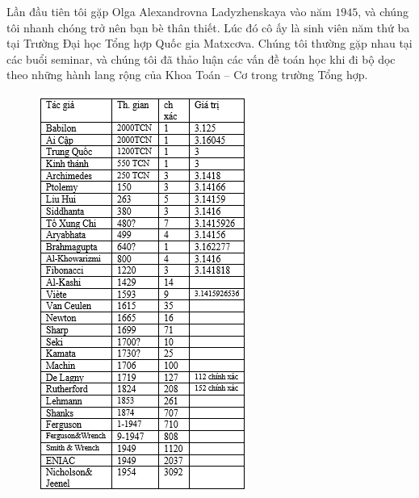 \begin{multicols}{2}
	Lần đầu tiên tôi gặp Olga Alexandrovna Ladyzhenskaya vào năm $1945$, và chúng tôi nhanh chóng trở nên bạn bè thân thiết. Lúc đó cô ấy là sinh viên năm thứ ba tại Trường Đại học Tổng hợp Quốc gia Matxcơva. Chúng tôi thường gặp nhau tại các buổi seminar, và chúng tôi đã thảo luận các vấn đề toán học khi đi bộ dọc theo những hành lang rộng  của Khoa Toán -- Cơ  trong trường Tổng hợp.
	\begin{figure}[H]
		\vspace*{-5pt}
		\centering
		\captionsetup{labelformat= empty, justification=centering}
		\includegraphics[width= 0.9\linewidth]{4}

\end{figure}
\end{multicols}

